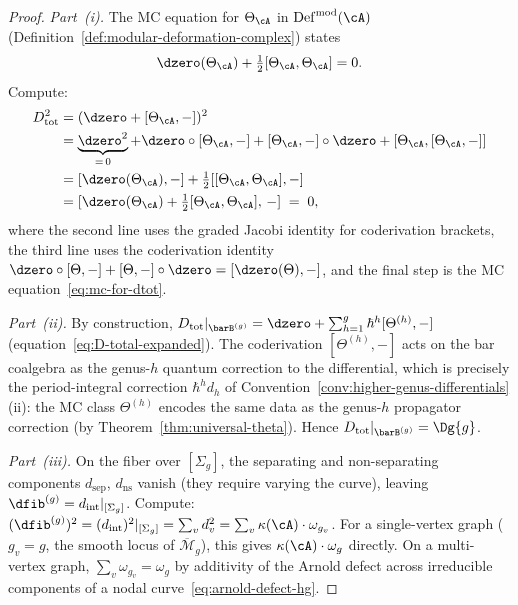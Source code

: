 \begin{proof}
\emph{Part~(i).}
The MC equation for $\Theta_\cA$ in
$\operatorname{Def}^{\mathrm{mod}}(\cA)$
(Definition~\ref{def:modular-deformation-complex}) states
\begin{equation}\label{eq:mc-for-dtot}
\dzero(\Theta_\cA) + \tfrac{1}{2}[\Theta_\cA, \Theta_\cA] = 0.
\end{equation}
Compute:
\begin{align*}
D_{\mathrm{tot}}^2
&= (\dzero + [\Theta_\cA, -])^2 \\
&= \underbrace{\dzero^2}_{=\,0}
  + \dzero \circ [\Theta_\cA, -]
  + [\Theta_\cA, -] \circ \dzero
  + [\Theta_\cA, [\Theta_\cA, -]] \\
&= [\dzero(\Theta_\cA), -]
  + \tfrac{1}{2}[[\Theta_\cA, \Theta_\cA], -] \\
&= [\dzero(\Theta_\cA) + \tfrac{1}{2}[\Theta_\cA, \Theta_\cA],\, -]
\;=\; 0,
\end{align*}
where the second line uses the graded Jacobi identity for
coderivation brackets, the third line uses the coderivation identity
$\dzero \circ [\Theta, -] + [\Theta, -] \circ \dzero
= [\dzero(\Theta), -]$, and the final step is the
MC equation~\eqref{eq:mc-for-dtot}.

\emph{Part~(ii).}
By construction,
$D_{\mathrm{tot}}|_{\barB^{(g)}} = \dzero +
\sum_{h=1}^g \hbar^h [\Theta^{(h)}, -]$
(equation~\eqref{eq:D-total-expanded}).
The coderivation $[\Theta^{(h)}, -]$ acts on the bar coalgebra
as the genus-$h$ quantum correction to the differential,
which is precisely the period-integral correction $\hbar^h d_h$
of Convention~\ref{conv:higher-genus-differentials}(ii):
the MC class $\Theta^{(h)}$ encodes the same data as the
genus-$h$ propagator correction (by
Theorem~\ref{thm:universal-theta}).
Hence $D_{\mathrm{tot}}|_{\barB^{(g)}} = \Dg{g}$.

\emph{Part~(iii).}
On the fiber over $[\Sigma_g]$, the separating and non-separating
components $d_{\mathrm{sep}}$, $d_{\mathrm{ns}}$ vanish (they
require varying the curve), leaving
$\dfib^{(g)} = d_{\mathrm{int}}|_{[\Sigma_g]}$.  Compute:
$(\dfib^{(g)})^2 = (d_{\mathrm{int}})^2|_{[\Sigma_g]}
= \sum_v d_v^2 = \sum_v \kappa(\cA) \cdot \omega_{g_v}$.
For a single-vertex graph ($g_v = g$, the smooth locus of
$\overline{\mathcal{M}}_g$), this gives $\kappa(\cA) \cdot
\omega_g$ directly.
On a multi-vertex graph, $\sum_v \omega_{g_v} = \omega_g$ by
additivity of the Arnold defect across irreducible components
of a nodal curve~\eqref{eq:arnold-defect-hg}.
\end{proof}

